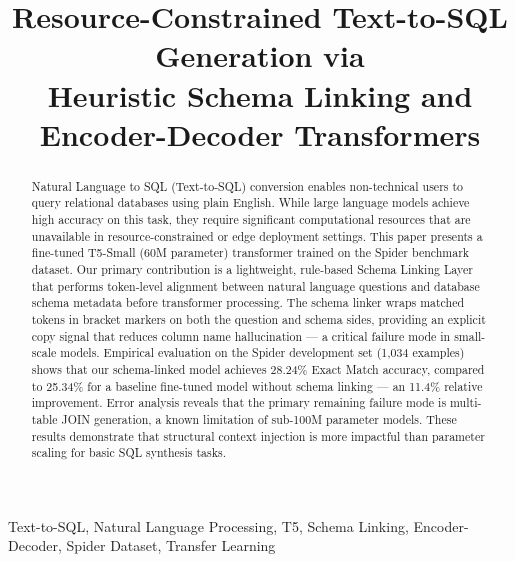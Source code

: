 \documentclass[conference]{IEEEtran}
\begin{document}
\title{Resource-Constrained Text-to-SQL Generation via\\
Heuristic Schema Linking and Encoder-Decoder Transformers}

\author{
}

\maketitle

\begin{abstract}
Natural Language to SQL (Text-to-SQL) conversion enables non-technical users to query relational databases using plain English. While large language models achieve high accuracy on this task, they require significant computational resources that are unavailable in resource-constrained or edge deployment settings. This paper presents a fine-tuned T5-Small (60M parameter) transformer trained on the Spider benchmark dataset. Our primary contribution is a lightweight, rule-based Schema Linking Layer that performs token-level alignment between natural language questions and database schema metadata before transformer processing. The schema linker wraps matched tokens in bracket markers on both the question and schema sides, providing an explicit copy signal that reduces column name hallucination — a critical failure mode in small-scale models. Empirical evaluation on the Spider development set (1,034 examples) shows that our schema-linked model achieves 28.24\% Exact Match accuracy, compared to 25.34\% for a baseline fine-tuned model without schema linking — an 11.4\% relative improvement. Error analysis reveals that the primary remaining failure mode is multi-table JOIN generation, a known limitation of sub-100M parameter models. These results demonstrate that structural context injection is more impactful than parameter scaling for basic SQL synthesis tasks.
\end{abstract}

\begin{IEEEkeywords}
Text-to-SQL, Natural Language Processing, T5, Schema Linking, Encoder-Decoder, Spider Dataset, Transfer Learning
\end{IEEEkeywords}

\end{document}
